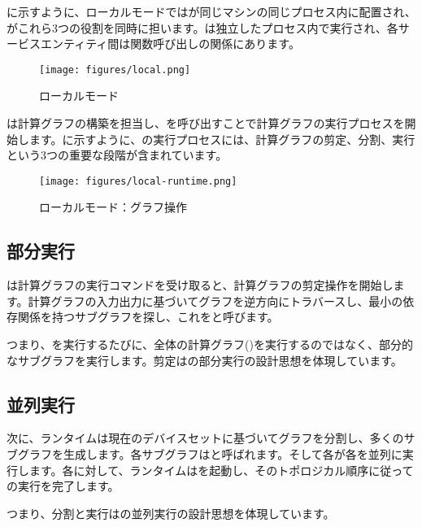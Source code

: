 \begin{content}

に示すように、ローカルモードではが同じマシンの同じプロセス内に配置され、がこれら3つの役割を同時に担います。は独立したプロセス内で実行され、各サービスエンティティ間は関数呼び出しの関係にあります。

\begin{figure}[H]
\centering
\texttt{[image: figures/local.png]}
\caption{ローカルモード}
 \label{fig:local}
\end{figure}

は計算グラフの構築を担当し、を呼び出すことで計算グラフの実行プロセスを開始します。に示すように、の実行プロセスには、計算グラフの剪定、分割、実行という3つの重要な段階が含まれています。

\begin{figure}[H]
\centering
\texttt{[image: figures/local-runtime.png]}
\caption{ローカルモード：グラフ操作}
 \label{fig:local-runtime}
\end{figure}

\subsection{部分実行}

は計算グラフの実行コマンドを受け取ると、計算グラフの剪定操作を開始します。計算グラフの入力出力に基づいてグラフを逆方向にトラバースし、最小の依存関係を持つサブグラフを探し、これをと呼びます。

つまり、を実行するたびに、全体の計算グラフ()を実行するのではなく、部分的なサブグラフを実行します。剪定は\tf{}の部分実行の設計思想を体現しています。

\subsection{並列実行}

次に、ランタイムは現在のデバイスセットに基づいてグラフを分割し、多くのサブグラフを生成します。各サブグラフはと呼ばれます。そして各が各を並列に実行します。各に対して、ランタイムはを起動し、そのトポロジカル順序に従っての実行を完了します。

つまり、分割と実行は\tf{}の並列実行の設計思想を体現しています。


\end{content}
